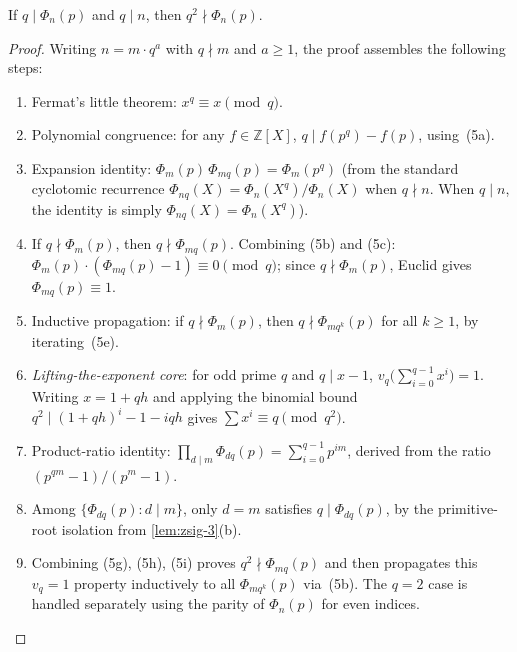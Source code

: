 \begin{lemma}\label{lem:zsig-5}
If $q \mid \Phi_n(p)$ and $q \mid n$, then $q^2 \nmid \Phi_n(p)$.
\end{lemma}
\begin{proof}
Writing $n = m \cdot q^a$ with $q \nmid m$ and $a \ge 1$,
the proof assembles the following steps:
\begin{enumerate}
  \item[\textbf{(5a)}] Fermat's little theorem: $x^q \equiv x \pmod{q}$.
  \item[\textbf{(5b)}] Polynomial congruence: for any $f \in \mathbb{Z}[X]$,
    $q \mid f(p^q) - f(p)$, using~(5a).
  \item[\textbf{(5c)}] Expansion identity:
    $\Phi_m(p)\,\Phi_{mq}(p) = \Phi_m(p^q)$ (from the standard cyclotomic
    recurrence $\Phi_{nq}(X) = \Phi_n(X^q)/\Phi_n(X)$ when $q \nmid n$.
    When $q \mid n$, the identity is simply $\Phi_{nq}(X) = \Phi_n(X^q)$).
  \item[\textbf{(5e)}] If $q \nmid \Phi_m(p)$, then $q \nmid \Phi_{mq}(p)$.
    Combining (5b) and (5c): $\Phi_m(p) \cdot (\Phi_{mq}(p)-1) \equiv 0
    \pmod q$; since $q \nmid \Phi_m(p)$, Euclid gives $\Phi_{mq}(p) \equiv 1$.
  \item[\textbf{(5f)}] Inductive propagation: if $q \nmid \Phi_m(p)$,
    then $q \nmid \Phi_{m q^k}(p)$ for all $k \ge 1$, by iterating~(5e).
  \item[\textbf{(5g)}] \emph{Lifting-the-exponent core}: for odd prime $q$
    and $q \mid x-1$, $v_q\bigl(\sum_{i=0}^{q-1} x^i\bigr) = 1$.
    Writing $x = 1 + qh$ and applying the binomial bound
    $q^2 \mid (1+qh)^i - 1 - iqh$ gives $\sum x^i \equiv q \pmod{q^2}$.
  \item[\textbf{(5h)}] Product-ratio identity: $\prod_{d \mid m} \Phi_{dq}(p)
    = \sum_{i=0}^{q-1} p^{im}$,
    derived from the ratio $(p^{qm}-1)/(p^m-1)$.
  \item[\textbf{(5i)}] Among $\{\Phi_{dq}(p) : d \mid m\}$, only $d = m$ satisfies
    $q \mid \Phi_{dq}(p)$, by the primitive-root isolation from \cref{lem:zsig-3}(b).
  \item[\textbf{(5-assembly)}] Combining (5g), (5h), (5i) proves
    $q^2 \nmid \Phi_{mq}(p)$ and then propagates this $v_q = 1$
    property inductively to all $\Phi_{m q^k}(p)$ via~(5b).
    The $q=2$ case is handled separately using the parity of $\Phi_n(p)$
    for even indices. \qedhere
\end{enumerate}
\end{proof}

